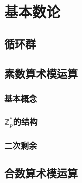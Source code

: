 \chapter{基本数论}\label{chap:apdx-1}

\section{循环群}

\section{素数算术模运算}

\subsection{基本概念}

\subsection{$\mathbb{Z}_p^*$的结构}

\subsection{二次剩余}\label{subsec:a-2-3}

\section{合数算术模运算}